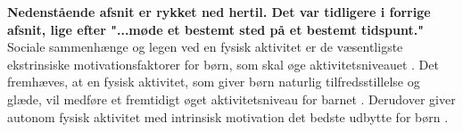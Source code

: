 \textbf{Nedenstående afsnit er rykket ned hertil. Det var tidligere i forrige afsnit, lige efter "...møde et bestemt sted på et bestemt tidspunt."}\newline
Sociale sammenhænge og legen ved en fysisk aktivitet er de væsentligste  ekstrinsiske motivationsfaktorer for børn, som skal øge aktivitetsniveauet \citep{McWhorter2003,J.Sebire2013}. Det fremhæves, at en fysisk aktivitet, som giver børn naturlig tilfredsstillelse og glæde, vil medføre et fremtidigt øget aktivitetsniveau for barnet \citep{Romani2013}. Derudover giver autonom fysisk aktivitet med intrinsisk motivation det bedste udbytte for børn \citep{J.Sebire2013}.


